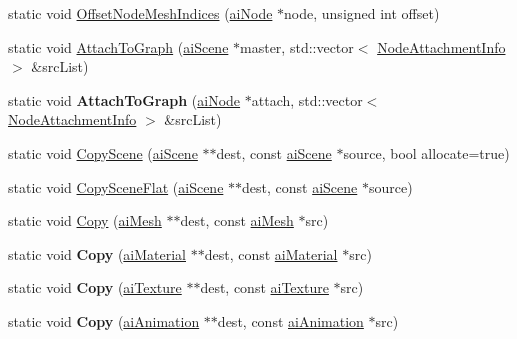 \begin{DoxyCompactItemize}
\item 
static void \hyperlink{class_assimp_1_1_scene_combiner_a03b9e3bc5e2d836bae03c87cc69e8359}{Offset\+Node\+Mesh\+Indices} (\hyperlink{structai_node}{ai\+Node} $\ast$node, unsigned int offset)
\item 
static void \hyperlink{class_assimp_1_1_scene_combiner_a29b11fa0954221fe028f602df4ac732b}{Attach\+To\+Graph} (\hyperlink{structai_scene}{ai\+Scene} $\ast$master, std\+::vector$<$ \hyperlink{struct_assimp_1_1_node_attachment_info}{Node\+Attachment\+Info} $>$ \&src\+List)
\item 
\hypertarget{class_assimp_1_1_scene_combiner_a8d06bd330bf1ccb6374f691bbf22dbe2}{static void {\bfseries Attach\+To\+Graph} (\hyperlink{structai_node}{ai\+Node} $\ast$attach, std\+::vector$<$ \hyperlink{struct_assimp_1_1_node_attachment_info}{Node\+Attachment\+Info} $>$ \&src\+List)}\label{class_assimp_1_1_scene_combiner_a8d06bd330bf1ccb6374f691bbf22dbe2}

\item 
static void \hyperlink{class_assimp_1_1_scene_combiner_a5873036f6b7b81c57857af273ad71c97}{Copy\+Scene} (\hyperlink{structai_scene}{ai\+Scene} $\ast$$\ast$dest, const \hyperlink{structai_scene}{ai\+Scene} $\ast$source, bool allocate=true)
\item 
static void \hyperlink{class_assimp_1_1_scene_combiner_aa2408f094b4948b4518560862c4a4ec2}{Copy\+Scene\+Flat} (\hyperlink{structai_scene}{ai\+Scene} $\ast$$\ast$dest, const \hyperlink{structai_scene}{ai\+Scene} $\ast$source)
\item 
static void \hyperlink{class_assimp_1_1_scene_combiner_ad78bbac399a4faf44dad90cc81c23312}{Copy} (\hyperlink{structai_mesh}{ai\+Mesh} $\ast$$\ast$dest, const \hyperlink{structai_mesh}{ai\+Mesh} $\ast$src)
\item 
\hypertarget{class_assimp_1_1_scene_combiner_a6cb2bd6717879dd09ca1368b71d2aad0}{static void {\bfseries Copy} (\hyperlink{classai_material}{ai\+Material} $\ast$$\ast$dest, const \hyperlink{classai_material}{ai\+Material} $\ast$src)}\label{class_assimp_1_1_scene_combiner_a6cb2bd6717879dd09ca1368b71d2aad0}

\item 
\hypertarget{class_assimp_1_1_scene_combiner_a24c74a29d29291ec2a738b6d7a45943e}{static void {\bfseries Copy} (\hyperlink{structai_texture}{ai\+Texture} $\ast$$\ast$dest, const \hyperlink{structai_texture}{ai\+Texture} $\ast$src)}\label{class_assimp_1_1_scene_combiner_a24c74a29d29291ec2a738b6d7a45943e}

\item 
\hypertarget{class_assimp_1_1_scene_combiner_a56601f1f572286c079855ce282807b70}{static void {\bfseries Copy} (\hyperlink{structai_animation}{ai\+Animation} $\ast$$\ast$dest, const \hyperlink{structai_animation}{ai\+Animation} $\ast$src)}\label{class_assimp_1_1_scene_combiner_a56601f1f572286c079855ce282807b70}


\end{DoxyCompactItemize}
